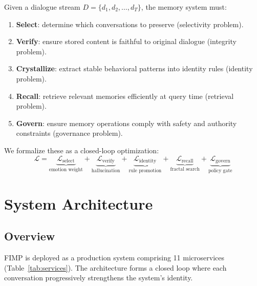 \documentclass[11pt,a4paper]{article}
\begin{document}
Given a dialogue stream $D = \{d_1, d_2, \dots, d_T\}$, the memory system must:

\begin{enumerate}[leftmargin=*, itemsep=2pt]
  \item \textbf{Select}: determine which conversations to preserve (selectivity problem).
  \item \textbf{Verify}: ensure stored content is faithful to original dialogue (integrity problem).
  \item \textbf{Crystallize}: extract stable behavioral patterns into identity rules (identity problem).
  \item \textbf{Recall}: retrieve relevant memories efficiently at query time (retrieval problem).
  \item \textbf{Govern}: ensure memory operations comply with safety and authority constraints (governance problem).
\end{enumerate}

We formalize these as a closed-loop optimization:
\[
  \mathcal{L} = \underbrace{\mathcal{L}_{\text{select}}}_{\text{emotion weight}} + \underbrace{\mathcal{L}_{\text{verify}}}_{\text{hallucination}} + \underbrace{\mathcal{L}_{\text{identity}}}_{\text{rule promotion}} + \underbrace{\mathcal{L}_{\text{recall}}}_{\text{fractal search}} + \underbrace{\mathcal{L}_{\text{govern}}}_{\text{policy gate}}
\]

\section{System Architecture}

\subsection{Overview}

FIMP is deployed as a production system comprising 11 microservices (Table~\ref{tab:services}). The architecture forms a closed loop where each conversation progressively strengthens the system's identity.
\end{document}
